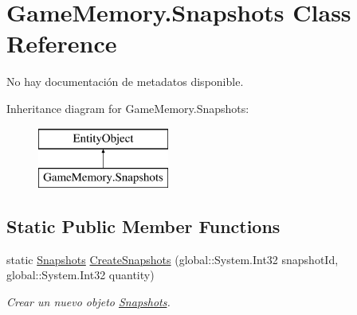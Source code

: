 \hypertarget{class_game_memory_1_1_snapshots}{\section{Game\-Memory.\-Snapshots Class Reference}
\label{class_game_memory_1_1_snapshots}
}


No hay documentación de metadatos disponible.  


Inheritance diagram for Game\-Memory.\-Snapshots\-:\begin{figure}[H]
\begin{center}
\leavevmode
\includegraphics[height=2.000000cm]{class_game_memory_1_1_snapshots}
\end{center}
\end{figure}
\subsection*{Static Public Member Functions}
\begin{DoxyCompactItemize}
\item 
static \hyperlink{class_game_memory_1_1_snapshots}{Snapshots} \hyperlink{class_game_memory_1_1_snapshots_a4d7ce7690220df76d6140fc067e0adb4}{Create\-Snapshots} (global\-::\-System.\-Int32 snapshot\-Id, global\-::\-System.\-Int32 quantity)
\begin{DoxyCompactList}\small\item\em Crear un nuevo objeto \hyperlink{class_game_memory_1_1_snapshots}{Snapshots}. \end{DoxyCompactList}\end{DoxyCompactItemize}
